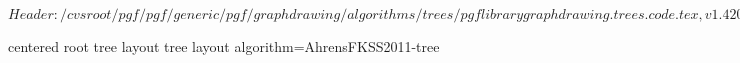 %
%
%

\ProvidesFileRCS[v\pgfversion] $Header: /cvsroot/pgf/pgf/generic/pgf/graphdrawing/algorithms/trees/pgflibrarygraphdrawing.trees.code.tex,v 1.4 2011/10/16 08:40:10 jannis-pohlmann Exp $




%
%

%
%
% 
% 



%
% 



%
%
%
%

\pgfgddeclarealgorithmkey
  {centered root tree layout}
  {tree layout}
  {algorithm=AhrensFKSS2011-tree}




\endinput

